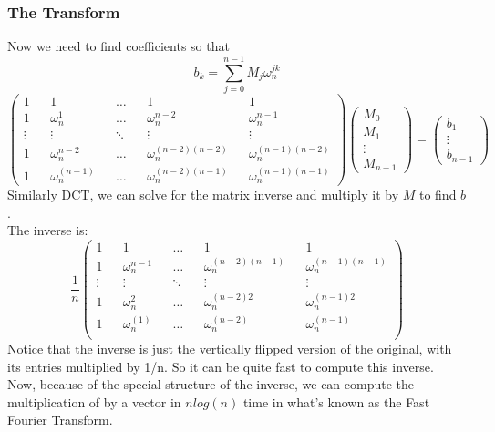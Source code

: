 \documentclass[12pt]{article}
\theoremstyle{definition}
\begin{document}
\subsubsection{The Transform}
Now we need to find coefficients so that
$$b_k = \sum_{j=0}^{n-1}M_j\omega_n^{jk}$$
$$\begin{pmatrix}
1 && 1 && \dots && 1 && 1 \\
1 && \omega_n^1 &&  \dots && \omega^{n-2}_n && \omega^{n-1}_n \\
 \vdots && \vdots && \ddots && \vdots && \vdots \\
1 && \omega^{n-2}_n && \dots && \omega^{(n-2)(n-2)}_n && \omega^{(n-1)(n-2)}_n \\
1 && \omega^{(n-1)}_n && \dots && \omega^{(n-2)(n-1)}_n && \omega^{(n-1)(n-1)}_n
\end{pmatrix}
\begin{pmatrix}
M_0 \\
M_1 \\
\vdots \\
M_{n-1}
\end{pmatrix} = 
\begin{pmatrix}
b_1 \\
\vdots\\
b_{n-1}
\end{pmatrix}
$$ 
Similarly DCT, we can solve for the matrix inverse and multiply it by $M$ to find $b$.
\\ \linebreak The inverse is:
$$
\frac{1}{n}
\begin{pmatrix}
	1 && 1 && \dots && 1 && 1 \\
	1 && \omega_n^{n-1} &&  \dots && \omega^{(n-2)(n-1)}_n && \omega^{(n-1)(n-1)}_n \\
	\vdots && \vdots && \ddots && \vdots && \vdots \\
	1 && \omega^{2}_n && \dots && \omega^{(n-2)2}_n && \omega^{(n-1)2}_n \\
	1 && \omega^{(1)}_n && \dots && \omega^{(n-2)}_n && \omega^{(n-1)}_n \\
\end{pmatrix}
$$
Notice that the inverse is just the vertically flipped version of the original, with its entries multiplied by 1/n. So it can be quite fast to compute this inverse.
\\ \linebreak
Now, because of the special structure of the inverse, we can compute the multiplication of by a vector in $nlog(n)$ time in what's known as the Fast Fourier Transform.
\\ \linebreak
\end{document}
